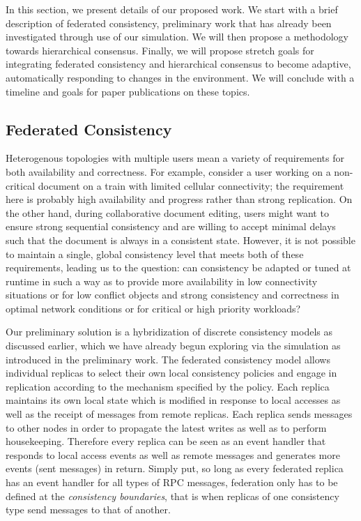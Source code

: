 \documentclass{article}
\begin{document}
In this section, we present details of our proposed work. We start with a brief description of federated consistency, preliminary work that has already been investigated through use of our simulation. We will then propose a methodology towards hierarchical consensus. Finally, we will propose stretch goals for integrating federated consistency and hierarchical consensus to become adaptive, automatically responding to changes in the environment. We will conclude with a timeline and goals for paper publications on these topics.

\subsection{Federated Consistency}
\label{sec:federated}

Heterogenous topologies with multiple users mean a variety of requirements for both availability and correctness. For example, consider a user working on a non-critical document on a train with limited cellular connectivity; the requirement here is probably high availability and progress rather than strong replication. On the other hand, during collaborative document editing, users might want to ensure strong sequential consistency and are willing to accept minimal delays such that the document is always in a consistent state. However, it is not possible to maintain a single, global consistency level that meets both of these requirements, leading us to the question: can consistency be adapted or tuned at runtime in such a way as to provide more availability in low connectivity situations or for low conflict objects and strong consistency and correctness in optimal network conditions or for critical or high priority workloads?

Our preliminary solution is a hybridization of discrete consistency models as discussed earlier, which we have already begun exploring via the simulation as introduced in the preliminary work. The federated consistency model allows individual replicas to select their own local consistency policies and engage in replication according to the mechanism specified by the policy. Each replica maintains its own local state which is modified in response to local accesses as well as the receipt of messages from remote replicas. Each replica sends messages to other nodes in order to propagate the latest writes as well as to perform housekeeping. Therefore every replica can be seen as an event handler that responds to local access events as well as remote messages and generates more events (sent messages) in return. Simply put, so long as every federated replica has an event handler for all types of RPC messages, federation only has to be defined at the \textit{consistency boundaries}, that is when replicas of one consistency type send messages to that of another.
\end{document}
